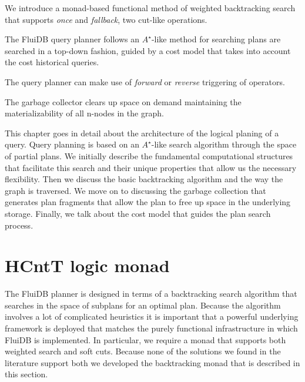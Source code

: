 
\begin{summary}
\item We introduce a monad-based functional method of weighted
  backtracking search that supports \emph{once} and \emph{fallback},
  two cut-like operations.
\item The FluiDB query planner follows an \(A^{\star}\)-like method for
  searching plans are searched in a top-down fashion, guided by a
  cost model that takes into account the cost historical queries.
\item The query planner can make use of \emph{forward} or
  \emph{reverse} triggering of operators.
\item The garbage collector clears up space on demand maintaining the
  materializability of all n-nodes in the graph.
\end{summary}

This chapter goes in detail about the architecture of the logical
planing of a query. Query planning is based on an \(A^{\star}\)-like
search algorithm through the space of partial plans. We initially
describe the fundamental computational structures that facilitate this
search and their unique properties that allow us the necessary
flexibility. Then we discuss the basic backtracking algorithm and the
way the graph is traversed. We move on to discussing the garbage
collection that generates plan fragments that allow the plan to free
up space in the underlying storage. Finally, we talk about the cost
model that guides the plan search process.

\section{HCntT logic monad}

The FluiDB planner is designed in terms of a backtracking search
algorithm that searches in the space of subplans for an optimal
plan. Because the algorithm involves a lot of complicated heuristics
it is important that a powerful underlying framework is deployed that
matches the purely functional infrastructure in which FluiDB is
implemented.  In particular, we require a monad that supports both
weighted search and soft cuts. Because none of the solutions we found
in the literature support both we developed the 
backtracking monad that is described in this section.

